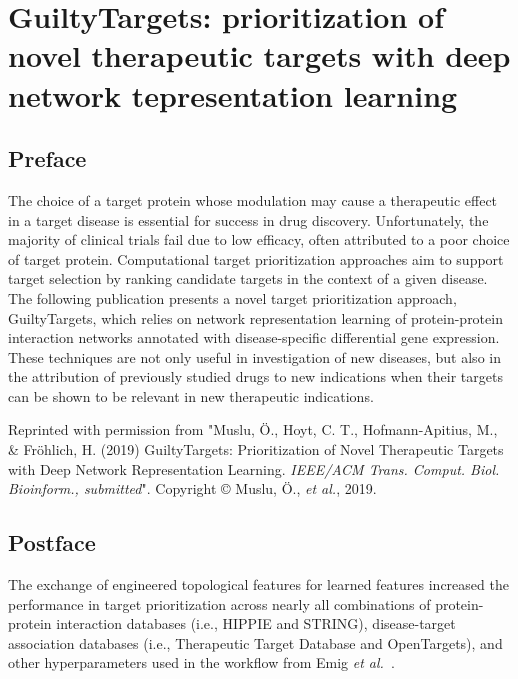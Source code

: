 \chapter{GuiltyTargets: prioritization of novel therapeutic targets with deep network tepresentation learning}
\label{ch:guiltytargets}

\section*{Preface}

The choice of a target protein whose modulation may cause a therapeutic effect in a target disease is essential for success in drug discovery.
Unfortunately, the majority of clinical trials fail due to low efficacy, often attributed to a poor choice of target protein.
Computational target prioritization approaches aim to support target selection by ranking candidate targets in the context of a given disease.
The following publication presents a novel target prioritization approach, GuiltyTargets, which relies on network representation learning of protein-protein interaction networks annotated with disease-specific differential gene expression.
These techniques are not only useful in investigation of new diseases, but also in the attribution of previously studied drugs to new indications when their targets can be shown to be relevant in new therapeutic indications.

\vspace*{\fill}

Reprinted with permission from "Muslu, Ö., Hoyt, C. T., Hofmann-Apitius, M., \& Fröhlich, H. (2019) GuiltyTargets: Prioritization of Novel Therapeutic Targets with Deep Network Representation Learning. \textit{IEEE/ACM Trans. Comput. Biol. Bioinform., submitted}".
Copyright © Muslu, Ö., \textit{et al.}, 2019.



\section*{Postface}

The exchange of engineered topological features for learned features increased the performance in target prioritization across nearly all combinations of protein-protein interaction databases (i.e., HIPPIE and STRING), disease-target association databases (i.e., Therapeutic Target Database and OpenTargets), and other hyperparameters used in the workflow from Emig \textit{et al.}~\cite{Emig2013}.

